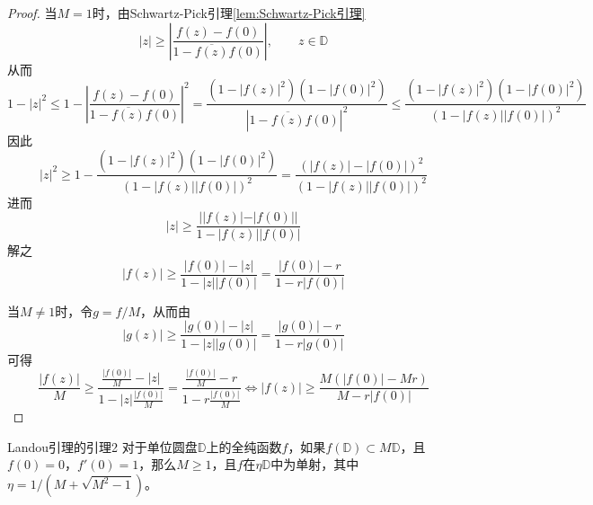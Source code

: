 \documentclass[lang = cn, scheme = chinese, thmcnt = section]{elegantbook}
\newcommand{\sub}{\subset}             %
\begin{document}
\begin{proof}
	当$M=1$时，由Schwartz-Pick引理\ref{lem:Schwartz-Pick引理}%
	$$
	|z|\ge \left| \frac{f(z)-f(0)}{1-\overline{f(z)}f(0)} \right|
	,\qquad
	z\in\mathbb{D}
	$$
	从而%
	$$
	1-|z|^2\le
	1-\left| \frac{f(z)-f(0)}{1-\overline{f(z)}f(0)} \right|^2
	=\frac{(1-|f(z)|^2)(1-|f(0)|^2)}{|1-\overline{f(z)}f(0)|^2}
	\le\frac{(1-|f(z)|^2)(1-|f(0)|^2)}{(1-|f(z)||f(0)|)^2}
	$$
	因此%
	$$
	|z|^2\ge 
	1-\frac{(1-|f(z)|^2)(1-|f(0)|^2)}{(1-|f(z)||f(0)|)^2}
	=\frac{(|f(z)|-|f(0)|)^2}{(1-|f(z)||f(0)|)^2}
	$$
	进而%
	$$
	|z|\ge \frac{||f(z)|-|f(0)||}{1-|f(z)||f(0)|}
	$$
	解之%
	$$
	|f(z)|\ge\frac{|f(0)|-|z|}{1-|z||f(0)|}
	=\frac{|f(0)|-r}{1-r|f(0)|}
	$$
	
	当$M\ne 1$时，令$g=f/M$，从而由
	$$
	|g(z)|\ge\frac{|g(0)|-|z|}{1-|z||g(0)|}
	=\frac{|g(0)|-r}{1-r|g(0)|}
	$$
	可得%
	$$
	\frac{|f(z)|}{M}\ge\frac{\frac{|f(0)|}{M}-|z|}{1-|z|\frac{|f(0)|}{M}}
	=\frac{\frac{|f(0)|}{M}-r}{1-r\frac{|f(0)|}{M}}
	\iff
	|f(z)|\ge\frac{M(|f(0)|-Mr)}{M-r|f(0)|}
	$$
\end{proof}

\begin{lemma}{}{Landou引理的引理2}
	对于单位圆盘$\mathbb{D}$上的全纯函数$f$，如果$f(\mathbb{D})\sub M\mathbb{D}$，且$f(0)=0$，$f'(0)=1$，那么$M\ge 1$，且$f$在$\eta\mathbb{D}$中为单射，其中$\eta=1/(M+\sqrt{M^2-1})$。
\end{lemma}
\end{document}
